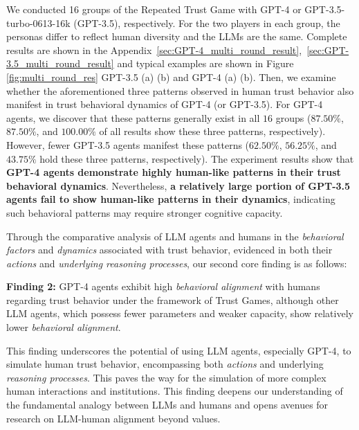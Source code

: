 
We conducted 16 groups of the Repeated Trust Game with GPT-4 or GPT-3.5-turbo-0613-16k (GPT-3.5), respectively. For the two players in each group, the personas  differ to reflect human diversity and the LLMs are the same. Complete results are shown in the Appendix~\ref{sec:GPT-4_multi_round_result},~\ref{sec:GPT-3.5_multi_round_result} and typical examples are shown in Figure \ref{fig:multi_round_res} GPT-3.5 (a) (b) and  GPT-4 (a) (b). Then, we examine whether the aforementioned three patterns observed in human trust behavior also manifest in trust behavioral dynamics of GPT-4  (or GPT-3.5). For GPT-4 agents, we discover that these  patterns generally exist in all $16$ groups ($87.50\%$, $87.50\%$, and $100.00\%$ of all results show these three patterns, respectively).  However, fewer GPT-3.5 agents manifest these patterns ($62.50\%$, $56.25\%$, and $43.75\%$ hold these three patterns, respectively). The experiment results show that \textbf{GPT-4 agents demonstrate highly human-like patterns in their trust behavioral dynamics}. Nevertheless, \textbf{a relatively large portion of GPT-3.5 agents fail to show human-like patterns in their dynamics}, indicating such behavioral patterns may require stronger cognitive capacity.





Through the comparative analysis of LLM agents and humans in the 
\textit{behavioral factors} and \textit{dynamics} associated with trust behavior, evidenced in both
their \textit{actions} and \textit{underlying reasoning processes}, our second core finding is as follows:

\vspace{-2.5mm}
\begin{center}
\begin{tcolorbox}[width=0.93\linewidth, boxrule=3pt, colback=gray!20, colframe=gray!20]
\textbf{Finding 2:} 
GPT-4 agents exhibit high \textit{behavioral alignment} with humans regarding trust behavior under the framework of Trust Games, although other LLM agents, which possess fewer parameters and weaker capacity, show relatively lower \textit{behavioral alignment}.



\end{tcolorbox}
\end{center}
\vspace{-2.5mm}
This finding underscores the potential of using LLM agents, especially GPT-4, to simulate human trust behavior, encompassing both  \textit{actions} and  underlying \textit{reasoning processes}. This paves the way for the simulation of more complex human interactions and institutions. This finding deepens our understanding of the fundamental analogy between LLMs and humans and opens avenues for research on LLM-human alignment beyond values.














